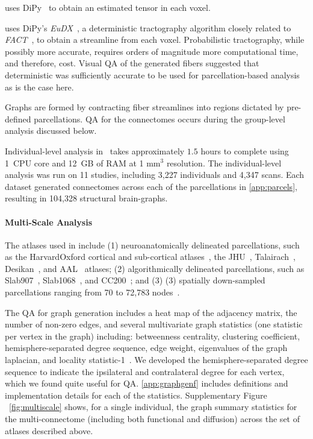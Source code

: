 \documentclass[11pt]{article}
\begin{document}
\begin{multicols}{2}
\begin{description}[style=unboxed,leftmargin=0cm]
    \item[Tensor Estimation] uses DiPy~\cite{dipy} to obtain an estimated tensor in each voxel.

    \item[Tractography] uses DiPy's \textit{EuDX}~\cite{eudx}, a deterministic tractography algorithm closely related to \textit{FACT}~\cite{fact}, to obtain a streamline from each voxel.
    Probabilistic tractography, while possibly more accurate, requires orders of magnitude more computational time, and therefore, cost.
    Visual QA of the generated fibers suggested that deterministic was sufficiently accurate to be used for parcellation-based analysis as is the case here.

    \item[Graph Generation] Graphs are formed by contracting fiber streamlines into regions dictated by pre-defined parcellations.
    QA for the connectomes occurs during the group-level analysis discussed below.
\end{description}

Individual-level analysis in \ndmg~takes approximately $1.5$ hours to complete using 1~CPU core and 12~GB of RAM at 1 mm$^3$ resolution.
The individual-level analysis was run on 11 studies, including 3,227 individuals and 4,347 scans.
Each dataset generated connectomes across each of the parcellations in \ref{app:parcels}, resulting in 104,328 structural brain-graphs.


\paragraph{Multi-Scale Analysis}

The atlases used in \ndmg include (1) neuroanatomically delineated parcellations, such as the HarvardOxford cortical and sub-cortical atlases~\cite{harvardoxford}, the JHU~\cite{jhu}, Talairach~\cite{talairach}, Desikan~\cite{desikan}, and AAL~\cite{aal} atlases; (2) algorithmically delineated parcellations, such as Slab907~\cite{slab907}, Slab1068~\cite{slab1068}, and CC200~\cite{cpac};  and (3) (3) spatially down-sampled parcellations ranging from 70 to 72,783 nodes~\cite{glocal}.

The QA for graph generation includes a heat map of the adjacency matrix, the number of non-zero edges, and several multivariate graph statistics (one statistic per vertex in the graph) including:  betweenness centrality, clustering coefficient, hemisphere-separated degree sequence, edge weight, eigenvalues of the graph laplacian, and locality statistic-1~\cite{glocal}.
We developed the hemisphere-separated degree sequence to indicate the ipsilateral and contralateral degree for each vertex, which we found quite useful for QA.  
\ref{app:graphgenf} includes definitions and implementation details for each of the statistics.
Supplementary Figure ~\ref{fig:multiscale} shows, for a single individual, the graph summary statistics for the multi-connectome (including both functional and diffusion) across the set of atlases described above.


\end{multicols}
\end{document}
